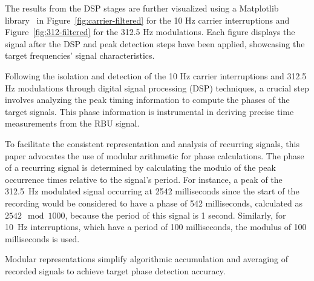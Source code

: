 \documentclass[12pt, a4paper]{extarticle}
\begin{document}
The results from the DSP stages are further visualized using a Matplotlib
library~\cite{pyplot} in Figure~\ref{fig:carrier-filtered} for the 10 Hz
carrier interruptions and Figure~\ref{fig:312-filtered} for the 312.5 Hz
modulations. Each figure displays the signal after the DSP and peak detection
steps have been applied, showcasing the target frequencies' signal
characteristics.

Following the isolation and detection of the 10 Hz carrier interruptions and
312.5 Hz modulations through digital signal processing (DSP) techniques, a
crucial step involves analyzing the peak timing information to compute the
phases of the target signals. This phase information is instrumental in
deriving precise time measurements from the RBU signal.


To facilitate the consistent representation and analysis of recurring signals,
this paper advocates the use of modular arithmetic for phase calculations. The
phase of a recurring signal is determined by calculating the modulo of the peak
occurrence times relative to the signal’s period. For instance, a peak of the
312.5~Hz modulated signal occurring at 2542 milliseconds since the start of
the recording would be considered to have a phase of 542 milliseconds,
calculated as \(2542 \mod 1000\), because the period of this signal is 1
second. Similarly, for 10~Hz interruptions, which have a period of 100
milliseconds, the modulus of 100 milliseconds is used.

Modular representations simplify algorithmic accumulation and averaging of
recorded signals to achieve target phase detection accuracy.
\end{document}
